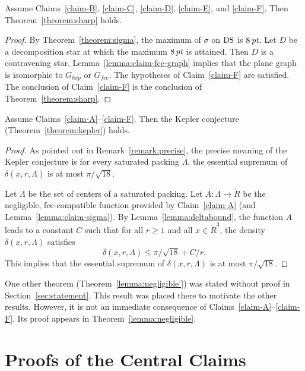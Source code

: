\begin{lemma}\label{lemma:claim-sharp}
Assume Claims~\ref{claim-B}, \ref{claim-C}, \ref{claim-D},
\ref{claim-E}, and \ref{claim-F}.  Then
Theorem~\ref{theorem:sharp} holds.
\end{lemma}

\begin{proof}  By Theorem~\ref{theorem:sigma}, the maximum of
$\sigma$ on ${\operatorname{DS}}$ is $8\,\hbox{\it pt}$.  Let $D$ be a decomposition
star at which the maximum $8\,\hbox{\it pt}$ is attained.  Then $D$ is a
contravening star. Lemma~\ref{lemma:claim-fcc-graph} implies that
the plane graph is isomorphic to $G_{hcp}$ or $G_{fcc}$.  The
hypotheses of Claim~\ref{claim-F} are satisfied.  The conclusion
of Claim~\ref{claim-F} is the conclusion of
Theorem~\ref{theorem:sharp}.
\end{proof}

\begin{lemma}
Assume Claims~\ref{claim-A}--\ref{claim-F}. Then the Kepler
conjecture (Theorem~\ref{theorem:kepler}) holds.
\end{lemma}

\begin{proof} As pointed out in Remark~\ref{remark:precise}, the precise
meaning of the Kepler conjecture is for every saturated packing
$\Lambda$, the essential supremum of $\delta(x,r,\Lambda)$ is at
most $\pi/\sqrt{18}$.

Let $\Lambda$ be the set of centers of a saturated packing.  Let
$A:\Lambda \to \ring{R}$ be the negligible, fcc-compatible
function provided by Claim~\ref{claim-A} (and
Lemma~\ref{lemma:claim-sigma}). By Lemma~\ref{lemma:deltabound},
the function $A$ leads to a constant $C$ such that for all $r\ge
1$ and all $x\in \ring{R}^3$, the density $\delta(x,r,\Lambda)$
satisfies
   $$\delta(x,r,\Lambda) \le \pi/\sqrt{18} + C/r.$$
This implies that the essential supremum of $\delta(x,r,\Lambda)$
is at most $\pi/\sqrt{18}$.
\end{proof}

\begin{remark}
One other theorem (Theorem~\ref{lemma:negligible'}) was stated
without proof in Section~\ref{sec:statement}.  This result was
placed there to motivate the other results.  However, it is not an
immediate consequence of Claims~\ref{claim-A}--\ref{claim-F}.  Its
proof appears in Theorem~\ref{lemma:negligible}.
\end{remark}

\section{Proofs of the Central Claims}

